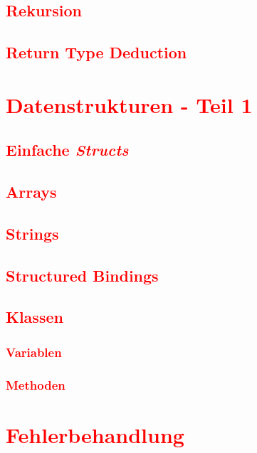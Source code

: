 \section{\textcolor{red}{Rekursion}}\label{sec:recursion}
\section{\textcolor{red}{Return Type Deduction}}\label{sec:return-type-deduction}

\cleardoublepage\chapter{\textcolor{red}{Datenstrukturen - Teil 1}}\label{chap:datastructures-1}
\section{\textcolor{red}{Einfache \textit{Structs}}}\label{sec:structs}
\section{\textcolor{red}{Arrays}}\label{sec:arrays}
\section{\textcolor{red}{Strings}}\label{sec:strings}
\section{\textcolor{red}{Structured Bindings}}\label{sec:structured-bindings}
\section{\textcolor{red}{Klassen}}\label{sec:classes}
\subsection{\textcolor{red}{Variablen}}\label{sec:class-variables}
\subsection{\textcolor{red}{Methoden}}\label{sec:class-methods}

\cleardoublepage\chapter{\textcolor{red}{Fehlerbehandlung}}\label{chap:error-handling}
